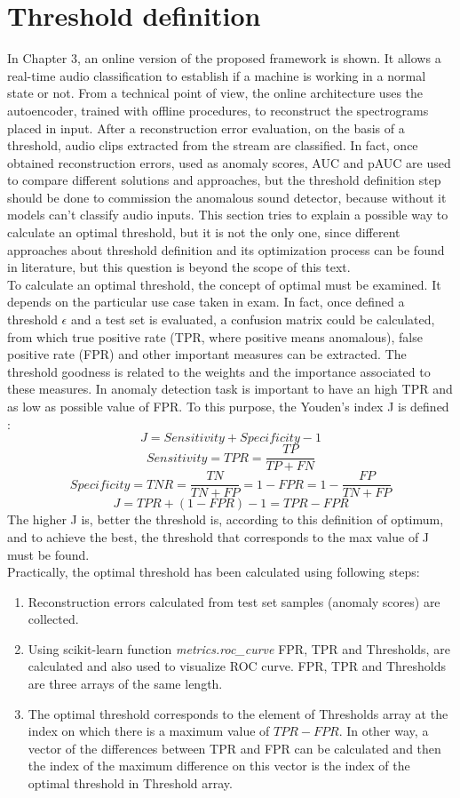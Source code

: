 \section{Threshold definition}
In Chapter 3, an online version of the proposed framework is shown. It allows a real-time audio classification to establish if a machine is working in a normal state or not. From a technical point of view, the online architecture uses the autoencoder, trained with offline procedures, to reconstruct the spectrograms placed in input. After a reconstruction error evaluation, on the basis of a threshold, audio clips extracted from the stream are classified. In fact, once obtained reconstruction errors, used as anomaly scores, AUC and pAUC are used to compare different solutions and approaches, but the threshold definition step should be done to commission the anomalous sound detector, because without it models can't classify audio inputs. This section tries to explain a possible way to calculate an optimal threshold, but it is not the only one, since different approaches about threshold definition and its optimization process can be found in literature, but this question is beyond the scope of this text. \\
To calculate an optimal threshold, the concept of optimal must be examined. It depends on the particular use case taken in exam. In fact, once defined a threshold $\epsilon$ and a test set is evaluated, a confusion matrix could be calculated, from which true positive rate (TPR, where positive means anomalous), false positive rate (FPR) and other important measures can be extracted. The threshold goodness is related to the weights and the importance associated to these measures. In anomaly detection task is important to have an high TPR and as low as possible value of FPR. To this purpose, the Youden's index J is defined \cite{13RealTimeDetectionUsingSequentialAutoencoder}:
\[ J = Sensitivity + Specificity - 1\]\[ Sensitivity = TPR = \frac{TP}{TP+FN}\]\[ Specificity = TNR = \frac{TN}{TN+FP} = 1-FPR = 1-\frac{FP}{TN+FP}\]\[ J = TPR+(1-FPR)-1 = TPR-FPR \]
The higher J is, better the threshold is, according to this definition of optimum, and to achieve the best, the threshold that corresponds to the max value of J must be found.\\
Practically, the optimal threshold has been calculated using following steps:
\begin{enumerate}
    \item {Reconstruction errors calculated from test set samples (anomaly scores) are collected.}
    \item {Using scikit-learn function \textit{metrics.roc\_curve} FPR, TPR and Thresholds, are calculated and also used to visualize ROC curve. FPR, TPR and Thresholds are three arrays of the same length.}
    \item {The optimal threshold corresponds to the element of Thresholds array at the index on which there is a maximum value of $TPR-FPR$. In other way, a vector of the differences between TPR and FPR can be calculated and then the index of the maximum difference on this vector is the index of the optimal threshold in Threshold array.}
\end{enumerate}
